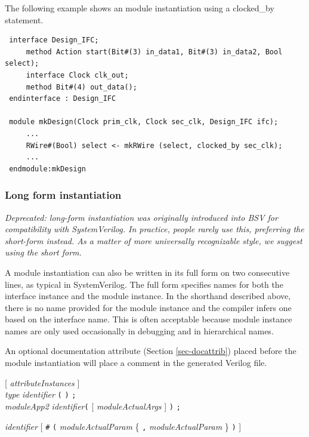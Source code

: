 \documentclass[twoside,letterpaper]{article}
\newcommand{\hm}{\hspace*{1em}}
\newcommand{\SV}{SystemVerilog}
\newcommand{\nterm}[1]{\emph{#1}}
\newcommand{\term}[1]{\texttt{#1}}
\newcommand{\many}[1]{\{ #1 \}}
\newcommand{\opt}[1]{[ #1 ]}
\newcommand{\gram}[2]{    \hm\makebox[10em][l]{\it #1}\makebox[1.5em][l]{::=}    #2}
\newcommand{\grammore}[1]{\hm\makebox[10em][l]{      }\makebox[1.5em][l]{}       #1}
\begin{document}
The following example shows an module instantiation using a
clocked\_by statement.

\begin{verbatim}
 interface Design_IFC;
     method Action start(Bit#(3) in_data1, Bit#(3) in_data2, Bool select);
     interface Clock clk_out;
     method Bit#(4) out_data();
 endinterface : Design_IFC

 module mkDesign(Clock prim_clk, Clock sec_clk, Design_IFC ifc);
     ... 
     RWire#(Bool) select <- mkRWire (select, clocked_by sec_clk);
     ...
 endmodule:mkDesign

\end{verbatim}


\subsubsection{Long form instantiation}

\emph{Deprecated: long-form instantiation was originally introduced
  into BSV for compatibility with SystemVerilog. In practice, people
  rarely use this, preferring the short-form instead. As a matter of
  more universally recognizable style, we suggest using the short
  form.}

A module instantiation can also be written in its full form on two
consecutive lines, as typical in {\SV}.  The full form specifies names for both the interface
instance and the module instance. In the shorthand described above,
there is no name provided for the module instance and the compiler
infers one based on the interface name.  This is often acceptable
because module instance names are only
 used occasionally in debugging and in hierarchical names.  

An optional documentation attribute (Section \ref{sec-docattrib})
placed before the module instantiation will place a comment in the
generated Verilog file.  


\gram{moduleInst} {\opt{\nterm{attributeInstances}}}\\
\grammore { \nterm{type} \nterm{identifier} \term{(} \term{)} \term{;} } \\
\grammore        { \nterm{moduleApp2} \nterm{identifier}\term{(} \opt{
\nterm{moduleActualArgs} } \term{)} \term{;} }

\gram{moduleApp2}{ \nterm{identifier}
                  \opt{ \term{\#} \term{(} \nterm{moduleActualParam}
                                           \many{ \term{,} \nterm{moduleActualParam} }
                                  \term{)} } }
\end{document}
